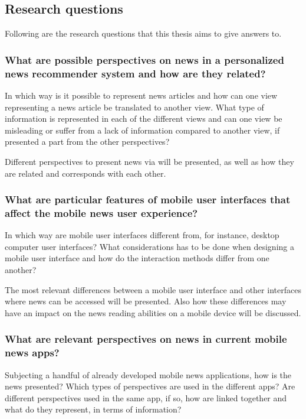 \subsection{Research questions}
Following are the research questions that this thesis aims to give answers to.

\subsubsection{What are possible perspectives on news in a personalized news recommender system and how are they related?}

In which way is it possible to represent news articles and how can one view representing a news article be translated to another view. What type of information is represented in each of the different views and can one view be misleading or suffer from a lack of information compared to another view, if presented a part from the other perspectives?

Different perspectives to present news via will be presented, as well as how they are related and corresponds with each other. 


\subsubsection{What are particular features of mobile user interfaces that affect the mobile news user experience?}

In which way are mobile user interfaces different from, for instance, desktop computer user interfaces? What considerations has to be done when designing a mobile user interface and how do the interaction methods differ from one another?

The most relevant differences between a mobile user interface and other interfaces where news can be accessed will be presented. Also how these differences may have an impact on the news reading abilities on a mobile device will be discussed.


\subsubsection{What are relevant perspectives on news in current mobile news apps?}

Subjecting a handful of already developed mobile news applications, how is the news presented? Which types of perspectives are used in the different apps? Are different perspectives used in the same app, if so, how are linked together and what do they represent, in terms of information?

